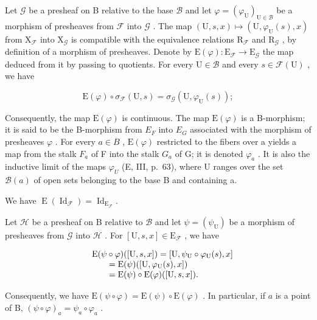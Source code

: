 Let \(\mathcal{G}\) be a presheaf on B relative to the base \(\mathcal{B}\) and let \(\varphi = (\varphi_{\mathrm{U}})_{\mathrm{U} \in \mathcal{B}}\) be a morphism of presheaves from \(\mathcal{F}\) into \(\mathcal{G}\) . The map \((\mathrm{U}, s, x) \mapsto (\mathrm{U}, \varphi_{\mathrm{U}}(s), x)\) from \(\mathrm{X}_{\mathcal{F}}\) into \(\mathrm{X}_{\mathcal{G}}\) is compatible with the equivalence relations \(\mathrm{R}_{\mathcal{F}}\) and \(\mathrm{R}_{\mathcal{G}}\) , by definition of a morphism of presheaves. Denote by \(\mathrm{E}(\varphi): \mathrm{E}_{\mathcal{F}} \to \mathrm{E}_{\mathcal{G}}\) the map deduced from it by passing to quotients. For every \(\mathrm{U} \in \mathcal{B}\) and every \(s \in \mathcal{F}(\mathrm{U})\) , we have

\[
\mathrm{E} (\varphi) \circ \sigma_ {\mathcal {F}} (\mathrm{U}, s) = \sigma_ {\mathcal {G}} (\mathrm{U}, \varphi_ {\mathrm{U}} (s));
\]

Consequently, the map \(\mathrm{E}(\varphi)\) is continuous. The map \(\mathrm{E}(\varphi)\) is a B-morphism; it is said to be the B-morphism from \(E_{F}\) into \(E_{G}\) associated with the morphism of presheaves \(\varphi\) . For every \(a \in B\) , \(\mathrm{E}(\varphi)\) restricted to the fibers over a yields a map from the stalk \(F_{a}\) of F into the stalk \(G_{a}\) of G; it is denoted \(\varphi_{a}\) . It is also the inductive limit of the maps \(\varphi_{U}\) (E, III, p.~63), where U ranges over the set \(\mathcal{B}(a)\) of open sets belonging to the base B and containing a.

We have \(\operatorname{E}(\operatorname{Id}_{\mathcal{F}}) = \operatorname{Id}_{\operatorname{E}_{\mathcal{F}}}.\)

Let \(\mathcal{H}\) be a presheaf on B relative to \(\mathcal{B}\) and let \(\psi = (\psi_{\mathrm{U}})\) be a morphism of presheaves from \(\mathcal{G}\) into \(\mathcal{H}\) . For \([\mathrm{U}, s, x] \in \mathrm{E}_{\mathcal{F}}\) , we have

\[
\begin{array}{r l} & {\mathrm{E} (\psi \circ \varphi) ([ \mathrm{U}, s, x ]) = [ \mathrm{U}, \psi_ {\mathrm{U}} \circ \varphi_ {\mathrm{U}} (s), x ]} \\ & {\qquad = \mathrm{E} (\psi) ([ \mathrm{U}, \varphi_ {\mathrm{U}} (s), x ])} \\ & {\qquad = \mathrm{E} (\psi) \circ \mathrm{E} (\varphi) ([ \mathrm{U}, s, x ]).} \end{array}
\]

Consequently, we have \(\mathrm{E}(\psi \circ \varphi) = \mathrm{E}(\psi) \circ \mathrm{E}(\varphi)\) . In particular, if \(a\) is a point of B, \((\psi \circ \varphi)_a = \psi_a \circ \varphi_a\) .

